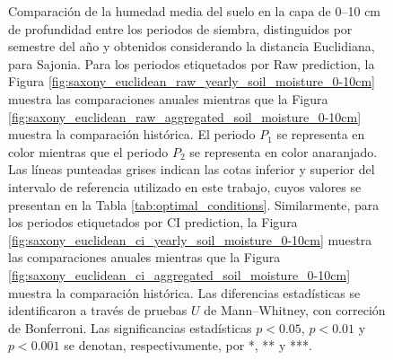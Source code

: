 \begin{figure}[htbp]
	\caption{
		Comparación de la humedad media del suelo en la capa de 0--10 cm de profundidad entre los periodos de siembra, distinguidos por semestre del año y obtenidos considerando la distancia Euclidiana, para Sajonia. Para los periodos etiquetados por Raw prediction, la Figura \ref{fig:saxony_euclidean_raw_yearly_soil_moisture_0-10cm} muestra las comparaciones anuales mientras que la Figura \ref{fig:saxony_euclidean_raw_aggregated_soil_moisture_0-10cm} muestra la comparación histórica. El periodo $P_1$ se representa en color mientras que el periodo $P_2$ se representa en color anaranjado. Las líneas punteadas grises indican las cotas inferior y superior del intervalo de referencia utilizado en este trabajo, cuyos valores se presentan en la Tabla \ref{tab:optimal_conditions}. Similarmente, para los periodos etiquetados por CI prediction, la Figura \ref{fig:saxony_euclidean_ci_yearly_soil_moisture_0-10cm} muestra las comparaciones anuales mientras que la Figura \ref{fig:saxony_euclidean_ci_aggregated_soil_moisture_0-10cm} muestra la comparación histórica. Las diferencias estadísticas se identificaron a través de pruebas $U$ de Mann--Whitney, con correción de Bonferroni. Las significancias estadísticas $p<0.05$, $p<0.01$ y $p<0.001$ se denotan, respectivamente, por *, ** y ***.
	}
	\label{fig:saxony_euclidean_soil_moisture_0-10cm}
	
	
\end{figure}



